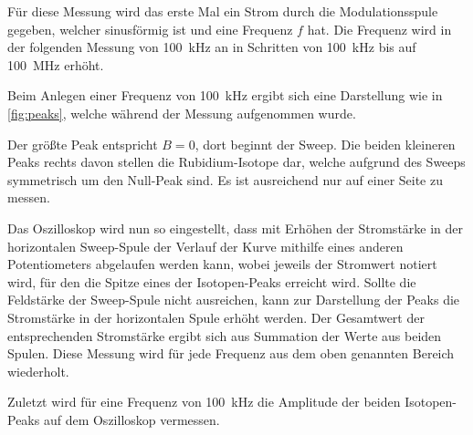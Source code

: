     Für diese Messung wird das erste Mal ein Strom durch die Modulationsspule gegeben,
    welcher sinusförmig ist und eine Frequenz $f$ hat.
    Die Frequenz wird in der folgenden Messung von \SI{100}{\kilo\hertz} an in Schritten von \SI{100}{\kilo\hertz} bis auf \SI{100}{\mega\hertz} erhöht.

    Beim Anlegen einer Frequenz von \SI{100}{\kilo\hertz} ergibt sich eine Darstellung wie in \autoref{fig:peaks},
    welche während der Messung aufgenommen wurde.

    Der größte Peak entspricht $B = 0$,
    dort beginnt der Sweep.
    Die beiden kleineren Peaks rechts davon stellen die Rubidium-Isotope dar,
    welche aufgrund des Sweeps symmetrisch um den Null-Peak sind.
    Es ist ausreichend nur auf einer Seite zu messen.

    Das Oszilloskop wird nun so eingestellt,
    dass mit Erhöhen der Stromstärke in der horizontalen Sweep-Spule der Verlauf der Kurve mithilfe eines anderen Potentiometers abgelaufen werden kann,
    wobei jeweils der Stromwert notiert wird,
    für den die Spitze eines der Isotopen-Peaks erreicht wird.
    Sollte die Feldstärke der Sweep-Spule nicht ausreichen,
    kann zur Darstellung der Peaks die Stromstärke in der horizontalen Spule erhöht werden.
    Der Gesamtwert der entsprechenden Stromstärke ergibt sich aus Summation der Werte aus beiden Spulen.
    Diese Messung wird für jede Frequenz aus dem oben genannten Bereich wiederholt.

    Zuletzt wird für eine Frequenz von \SI{100}{\kilo\hertz} die Amplitude der beiden Isotopen-Peaks auf dem Oszilloskop vermessen.
